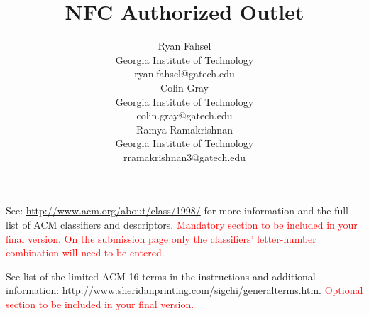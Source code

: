 \documentclass{sigchi}
\begin{document}
\title{NFC Authorized Outlet}

\author{
  \alignauthor Ryan Fahsel\\
    \affaddr Georgia Institute of Technology\\
    \email ryan.fahsel@gatech.edu\\
  \alignauthor Colin Gray\\
    \affaddr Georgia Institute of Technology\\
    \email colin.gray@gatech.edu\\
  \alignauthor Ramya Ramakrishnan\\
    \affaddr Georgia Institute of Technology\\
    \email rramakrishnan3@gatech.edu\\
}

\maketitle

\begin{abstract}

\end{abstract}



See: \url{http://www.acm.org/about/class/1998/}
for more information and the full list of ACM classifiers
and descriptors.
\textcolor{red}{Mandatory section to be included in your
final version. On the submission page only the classifiers'
letter-number combination will need to be entered.}


See list of the limited ACM 16 terms in the
instructions and additional information:
\url{http://www.sheridanprinting.com/sigchi/generalterms.htm}.
\textcolor{red}{Optional section to be included in your final version.}
\end{document}
